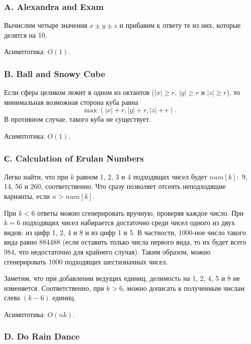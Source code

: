 \subsubsection*{A. Alexandra and Exam} 


Вычислим четыре значения $x \pm y \pm z$ и прибавим к ответу те из них, которые делятся на 10.

Асимптотика: $O(1)$.



\subsubsection*{B. Ball and Snowy Cube} 


Если сфера целиком лежит в одном из октантов ($|x| \geqslant r$, $|y| \geqslant r$ и $|z| \geqslant r$), то минимальная возможная сторона куба равна
$$\max(|x| + r, |y| + r, |z| + r).$$
В противном случае, такого куба не существует.

Асимптотика: $O(1)$.



\subsubsection*{С. Calculation of Erulan Numbers} 


Легко найти, что при $k$ равном 1, 2, 3 и 4 подходящих чисел будет $num[k]:$ 9, 14, 56 и 260, соответственно. Что сразу позволяет отсеять неподходящие варианты, если $n > num[k]$.

При $k < 6$ ответы можно сгенерировать вручную, проверяя каждое число. При $k = 6$ подходящих чисел набирается достаточно среди чисел одного из двух видов: из цифр 1, 2, 4 и 8 и из цифр 1 и 5. В частности, 1000-ное число такого вида равно 884488 (если оставить только числа первого вида, то их будет всего 984, что недостаточно для крайнего случая). Таким образом, можно сгенерировать 1000 подходящих шестизначных чисел.

Заметим, что при добавлении ведущих единиц, делимость на 1, 2, 4, 5 и 8 не изменяется. Соответственно, при $k > 6$, можно дописать к полученным числам слева $(k-6)$ единиц.

Асимптотика: $O(n k)$.



\subsubsection*{D. Do Rain Dance} 

